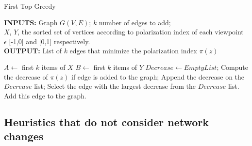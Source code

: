 \begin{algorithm}[htbp]
	\caption{First Top Greedy}
	\label{alg:kgreedy}
	
	\begin{flushleft}
        		\textbf{INPUTS:} Graph $G(V, E)$; $k$ number of edges to add;\\
		$X$, $Y $, the sorted set of vertices according to polarization index of each viewpoint $\epsilon$ [-1,0] and [0,1] respectively.\\
		\vspace{6pt}
        		\textbf{OUTPUT:} List of $k$ edges that minimize the polarization index $\pi(z)$
	\end{flushleft}
	
	\begin{algorithmic}[1]
		\STATE $A \leftarrow $ first $k$ items of $X$
		\STATE $B \leftarrow $ first $k$ items of $Y$
			\STATE$Decrease \leftarrow Empty List$;
				\STATE Compute the decrease of $\pi(z)$ if edge is added to the graph;
				\STATE Append the decrease on the $Decrease$ list;
			\ENDFOR
			\STATE Select the edge with the largest decrease from the $Decrease$ list.
			\STATE Add this edge to the graph.
		\ENDFOR
	\end{algorithmic}
	
\end{algorithm}
		
\clearpage


\subsection{Heuristics that do not consider network changes}
\label{sec:netChangesConsidered}
\vspace{10pt}

